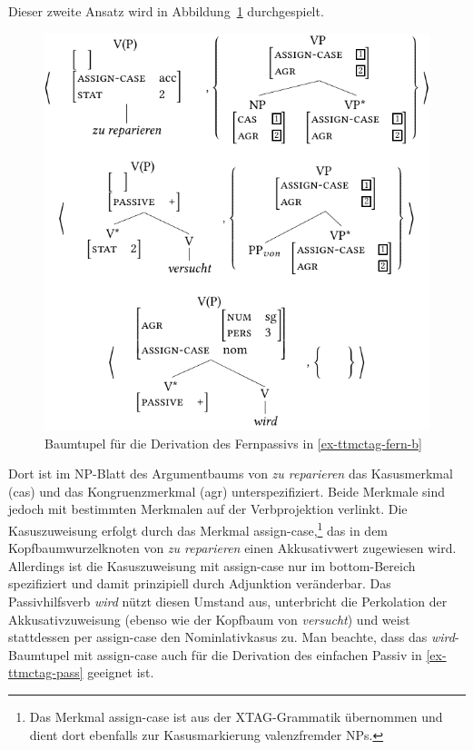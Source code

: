 Dieser zweite Ansatz wird in Abbildung~\ref{fig-ttmctag-fern-2} durchgespielt. 
\begin{figure}[t]
\centering
\includegraphics{graphics/abb723.pdf}
\caption{\label{fig-ttmctag-fern-2}Baumtupel für die Derivation des Fernpassivs in \ref{ex-ttmctag-fern-b}}
\end{figure}
Dort ist im NP-Blatt des Argumentbaums von {\it zu reparieren} das Kasusmerkmal ({\sc cas}) und das Kongruenzmerkmal ({\sc agr}) unterspezifiziert. Beide Merkmale sind jedoch mit bestimmten Merkmalen auf der Verbprojektion verlinkt. Die Kasuszuweisung erfolgt durch das Merkmal {\sc assign-case},\footnote{Das Merkmal {\sc assign-case} ist aus der XTAG-Grammatik übernommen und dient dort ebenfalls zur Kasusmarkierung valenzfremder NPs.} das in dem Kopfbaumwurzelknoten von {\it zu reparieren} einen Akkusativwert zugewiesen wird. Allerdings ist die Kasuszuweisung mit {\sc assign-case} nur im {\sc bottom}-Bereich spezifiziert und damit prinzipiell durch Adjunktion veränderbar. Das Passivhilfsverb {\it wird} nützt diesen Umstand aus, unterbricht die Perkolation der Akkusativzuweisung (ebenso wie der Kopfbaum von {\it versucht}) und weist stattdessen per {\sc assign-case} den Nominlativkasus zu. Man beachte, dass das {\it wird}-Baumtupel mit {\sc assign-case} auch für die Derivation des einfachen Passiv in \ref{ex-ttmctag-pass} geeignet ist. %

